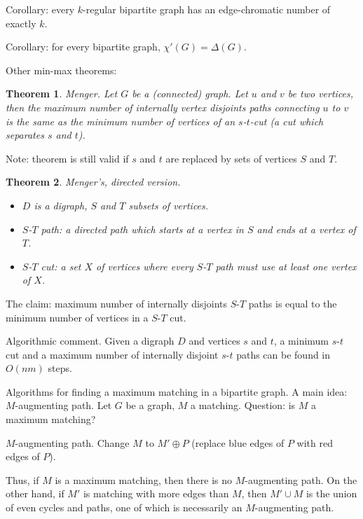 \documentclass[12pt,a4paper]{article}
\newtheorem{theorem}{Theorem}
\begin{document}
Corollary: every \(k\)-regular bipartite graph has an edge-chromatic number of
exactly \(k\).

Corollary: for every bipartite graph, \(\chi'(G) = \Delta(G)\).

Other min-max theorems:

\begin{theorem}
  Menger.  Let \(G\) be a (connected) graph.  Let \(u\) and \(v\) be two
  vertices, then the maximum number of internally vertex disjoints paths
  connecting \(u\) to \(v\) is the same as the minimum number of vertices of an
  \(s\)-\(t\)-cut (a cut which separates \(s\) and \(t\)).
\end{theorem}

Note: theorem is still valid if \(s\) and \(t\) are replaced by sets of vertices
\(S\) and \(T\).

\begin{theorem}
  Menger's, directed version.
  \begin{itemize}
  \item \(D\) is a digraph, \(S\) and \(T\) subsets of vertices.
  \item \(S\)-\(T\) path: a directed path which starts at a vertex in \(S\) and
    ends at a vertex of \(T\).
  \item \(S\)-\(T\) cut: a set \(X\) of vertices where every \(S\)-\(T\) path
    must use at least one vertex of \(X\).
  \end{itemize}
\end{theorem}

The claim: maximum number of internally disjoints \(S\)-\(T\) paths is equal to
the minimum number of vertices in a \(S\)-\(T\) cut.

Algorithmic comment.  Given a digraph \(D\) and vertices \(s\) and \(t\), a
minimum \(s\)-\(t\) cut and a maximum number of internally disjoint \(s\)-\(t\)
paths can be found in \(O(n m)\) steps.

Algorithms for finding a maximum matching in a bipartite graph.  A main idea:
\(M\)-augmenting path.  Let \(G\) be a graph, \(M\) a matching.  Question: is
\(M\) a maximum matching?

\(M\)-augmenting path.  Change \(M\) to \(M' \oplus P\) (replace blue edges of
\(P\) with red edges of \(P\)).

Thus, if \(M\) is a maximum matching, then there is no \(M\)-augmenting path.
On the other hand, if \(M'\) is matching with more edges than \(M\), then
\(M' \cup M\) is the union of even cycles and paths, one of which is necessarily
an \(M\)-augmenting path.
\end{document}
